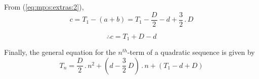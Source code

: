 {From (\ref{eq:mp:s:extras:2}),
\begin{equation*}
c = T_1 - (a + b) = T_1 - \frac{D}{2} - d + \frac{3}{2}\,.\, D
\end{equation*}

\begin{equation}
\label{eq:mp:s:extras:8}
\therefore c = T_1 + D - d
\end{equation}

Finally, the general equation for the $n^{th}$-term of a quadratic sequence is
given by
\begin{equation}
\label{eq:mp:s:extras:9}
T_n = \frac{D}{2}\,.\, {n^2} + (d - \frac {3} {2} \: D)\,.\, n + (T_1 - d + D)
\end{equation}}


